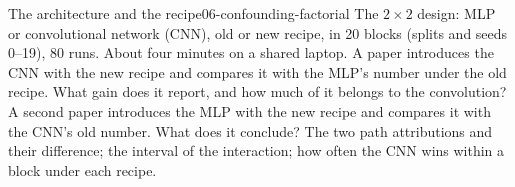 \begin{refsection}
\begin{lab}{The architecture and the recipe}{06-confounding-factorial}\label{lab:confounding:factorial}
 The $2\times2$ design: MLP or convolutional network (CNN), old or new recipe, in 20 blocks (splits and seeds 0--19), 80 runs. About four minutes on a shared laptop.
 A paper introduces the CNN with the new recipe and compares it with the MLP's number under the old recipe. What gain does it report, and how much of it belongs to the convolution? A second paper introduces the MLP with the new recipe and compares it with the CNN's old number. What does it conclude?
 The two path attributions and their difference; the interval of the interaction; how often the CNN wins within a block under each recipe.
\end{lab}


\end{refsection}

